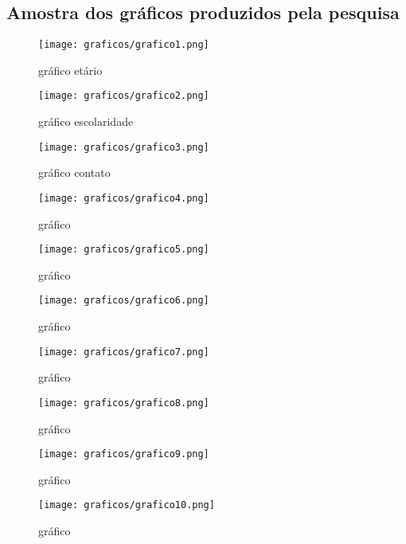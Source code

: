 \documentclass[
	article,			%
	12pt,				%
	oneside,			%
	a4paper,			%
	english,			%
	brazil,				%
	sumario=tradicional
	]{abntex2}
\begin{document}
\begin{anexosenv}

\chapter{Amostra dos gráficos produzidos pela pesquisa}
\begin{figure}[h!]
\centering
\texttt{[image: graficos/grafico1.png]} %
\caption{gráfico etário}
\label{fig:grafico}
\end{figure}


\begin{figure}[h!]
\centering
\texttt{[image: graficos/grafico2.png]}
\caption{gráfico escolaridade}
\label{fig:grafico}
\end{figure}

\begin{figure}[h!]
\centering
\texttt{[image: graficos/grafico3.png]}
\caption{gráfico contato}
\label{fig:grafico}
\end{figure}

\begin{figure}[h!]
\centering
\texttt{[image: graficos/grafico4.png]}
\caption{gráfico }
\label{fig:grafico}
\end{figure}

\begin{figure}[h!]
\centering
\texttt{[image: graficos/grafico5.png]}
\caption{gráfico }
\label{fig:grafico}
\end{figure}

\begin{figure}[h!]
\centering
\texttt{[image: graficos/grafico6.png]}
\caption{gráfico }
\label{fig:grafico}
\end{figure}

\begin{figure}[h!]
\centering
\texttt{[image: graficos/grafico7.png]}
\caption{gráfico }
\label{fig:grafico}
\end{figure}

\begin{figure}[h!]
\centering
\texttt{[image: graficos/grafico8.png]}
\caption{gráfico }
\label{fig:grafico}
\end{figure}

\begin{figure}[h!]
\centering
\texttt{[image: graficos/grafico9.png]}
\caption{gráfico }
\label{fig:grafico}
\end{figure}

\begin{figure}[h!]
\centering
\texttt{[image: graficos/grafico10.png]}
\caption{gráfico }
\label{fig:grafico}
\end{figure}


\end{anexosenv}
\end{document}
